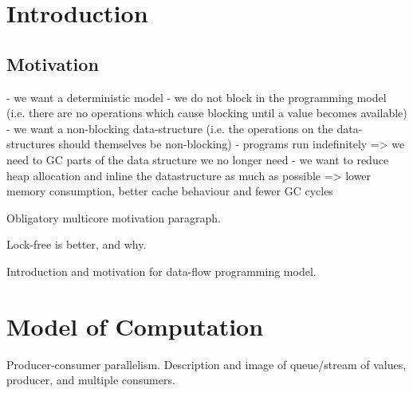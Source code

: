 \documentclass[runningheads,a4paper]{llncs}
\begin{document}
\section{Introduction}


\subsection{Motivation}

- we want a deterministic model
- we do not block in the programming model (i.e. there are no
operations which cause blocking until a value becomes available)
- we want a non-blocking data-structure (i.e. the operations on the
data-structures should themselves be non-blocking)
- programs run indefinitely => we need to GC parts of the
data structure we no longer need
- we want to reduce heap allocation and inline the datastructure as
much as possible => lower memory consumption, better cache behaviour
and fewer GC cycles


Obligatory multicore motivation paragraph.

Lock-free is better, and why.

Introduction and motivation for data-flow programming model.

\section{Model of Computation}
Producer-consumer parallelism. Description and image of queue/stream of values, producer, and multiple consumers. 
\end{document}
